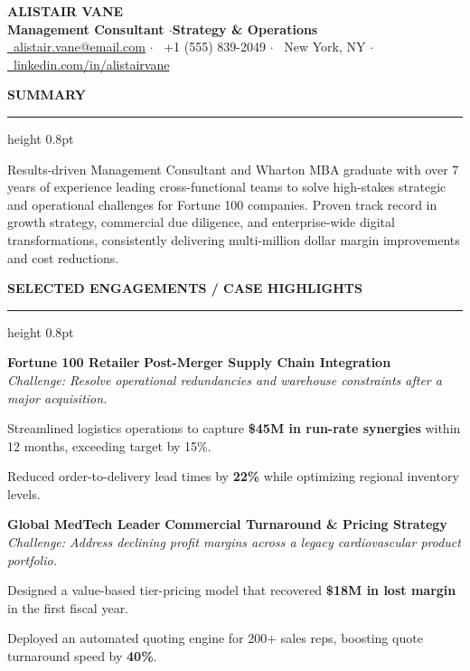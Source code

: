 \documentclass[10pt,letterpaper]{article}
\newcommand{\cvsection}[1]{%
  \vspace{9pt}%
  {\large\bfseries\color{accent}\MakeUppercase{#1}}%
  \vspace{3pt}%
  {\color{bordergray}\hrule height 0.8pt}%
  \vspace{5pt}%
}
\begin{document}
\begin{center}
  {\Huge\bfseries\color{accent} ALISTAIR VANE} \\[4pt]
  {\large\bfseries\color{lightgray} Management Consultant \quad$\cdot$\quad Strategy \& Operations} \\[6pt]
  \small
  \href{mailto:alistair.vane@email.com}{\faEnvelope\ alistair.vane@email.com} \quad$\cdot$\quad
  \faPhone\ +1 (555) 839-2049 \quad$\cdot$\quad
  \faMapMarker\ New York, NY \quad$\cdot$\quad
  \href{https://linkedin.com/in/alistairvane}{\faLinkedin\ linkedin.com/in/alistairvane}
\end{center}
\vspace{4pt}

\cvsection{Summary}
Results-driven Management Consultant and Wharton MBA graduate with over 7 years of experience leading cross-functional teams to solve high-stakes strategic and operational challenges for Fortune 100 companies. Proven track record in growth strategy, commercial due diligence, and enterprise-wide digital transformations, consistently delivering multi-million dollar margin improvements and cost reductions.

\cvsection{Selected Engagements / Case Highlights}

\textbf{Fortune 100 Retailer} \hfill \textbf{Post-Merger Supply Chain Integration} \\
\textit{Challenge: Resolve operational redundancies and warehouse constraints after a major acquisition.}
\begin{cvitemize}
  \item Streamlined logistics operations to capture \textbf{\$45M in run-rate synergies} within 12 months, exceeding target by 15\%.
  \item Reduced order-to-delivery lead times by \textbf{22\%} while optimizing regional inventory levels.
\end{cvitemize}

\vspace{5pt}
\textbf{Global MedTech Leader} \hfill \textbf{Commercial Turnaround \& Pricing Strategy} \\
\textit{Challenge: Address declining profit margins across a legacy cardiovascular product portfolio.}
\begin{cvitemize}
  \item Designed a value-based tier-pricing model that recovered \textbf{\$18M in lost margin} in the first fiscal year.
  \item Deployed an automated quoting engine for 200+ sales reps, boosting quote turnaround speed by \textbf{40\%}.
\end{cvitemize}
\end{document}
